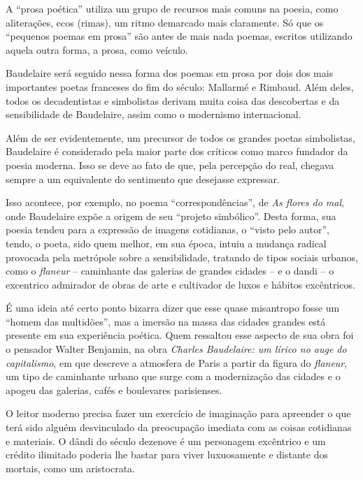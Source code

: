 \documentclass[12pt]{extarticle}
\begin{document}
A ``prosa poética'' utiliza um grupo de recursos mais comuns na poesia,
como aliterações, ecos (rimas), um ritmo demarcado mais claramente.
Só que os ``pequenos poemas em prosa'' são antes de mais nada poemas,
escritos utilizando aquela outra forma, a prosa, como veículo.

Baudelaire será seguido nessa forma dos poemas em prosa por dois dos
mais importantes poetas franceses do fim do século: Mallarmé e
Rimbaud.
Além deles, todos os decadentistas e simbolistas derivam muita coisa
das descobertas e da sensibilidade de Baudelaire, assim como o
modernismo internacional.

Além de ser evidentemente, um precursor de todos os grandes poetas
simbolistas, Baudelaire é considerado pela maior parte dos críticos como
marco fundador da poesia moderna. Isso se deve ao fato de que, pela
percepção do real, chegava sempre a um equivalente do
sentimento que desejasse expressar.

Isso acontece, por exemplo, no poema ``correspondências'', de
\emph{As flores do mal}, onde Baudelaire expõe a origem de seu ``projeto simbólico''.
Desta forma, sua poesia tendeu para a expressão de imagens cotidianas, o
``visto pelo autor'', tendo, o poeta, sido quem melhor, em sua época,
intuiu a mudança radical provocada pela
metrópole sobre a
sensibilidade, tratando de tipos sociais urbanos, como o \textit{flaneur} --
caminhante das galerias de grandes cidades -- e o dandi -- o excentrico
admirador de obras de arte e cultivador de luxos e hábitos excêntricos.




É uma ideia até certo ponto bizarra dizer que esse quase misantropo
fosse um ``homem das multidões'', mas a imersão na massa das cidades
grandes está presente em sua experiência poética.
Quem ressaltou esse aspecto de sua obra foi o pensador Walter Benjamin,
na obra \textit{Charles Baudelaire: um lírico no auge do capitalismo}, em
que descreve a atmosfera de Paris a partir da figura do \textit{flaneur}, um
tipo de caminhante urbano que surge com a modernização das cidades e o
apogeu das galerias, cafés e boulevares parisienses.




O leitor moderno precisa fazer um exercício de imaginação para apreender
o que terá sido alguém desvinculado da preocupação imediata com as
coisas cotidianas e materiais.
O dândi do século dezenove é um personagem excêntrico e um crédito
ilimitado poderia lhe bastar para viver luxuosamente e distante dos
mortais, como um aristocrata.
\end{document}
